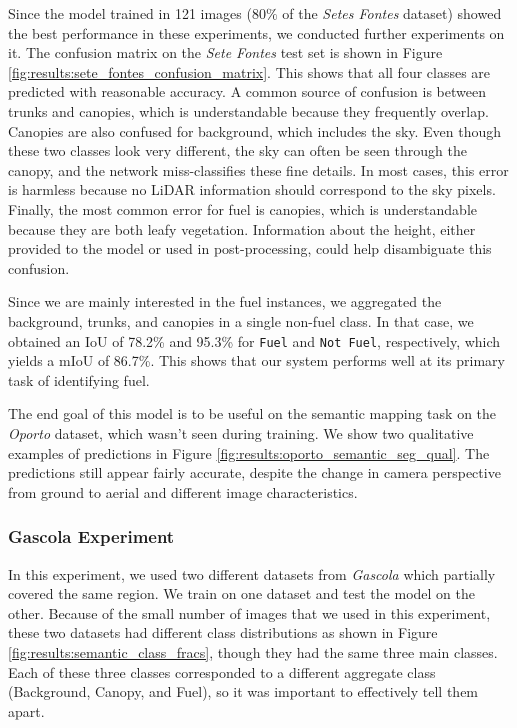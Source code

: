Since the model trained in 121 images ($80\%$ of the \textit{Setes Fontes} dataset) showed the best performance in these experiments, we conducted further experiments on it. The confusion matrix on the \textit{Sete Fontes} test set is shown in Figure \ref{fig:results:sete_fontes_confusion_matrix}. This shows that all four classes are predicted with reasonable accuracy. A common source of confusion is between trunks and canopies, which is understandable because they frequently overlap. Canopies are also confused for background, which includes the sky. Even though these two classes look very different, the sky can often be seen through the canopy, and the network miss-classifies these fine details. In most cases, this error is harmless because no LiDAR information should correspond to the sky pixels. Finally, the most common error for fuel is canopies, which is understandable because they are both leafy vegetation. Information about the height, either provided to the model or used in post-processing, could help disambiguate this confusion. 

Since we are mainly interested in the fuel instances, we aggregated the background, trunks, and canopies in a single non-fuel class. In that case, we obtained an IoU of 78.2\% and 95.3\% for \texttt{Fuel} and \texttt{Not Fuel}, respectively, which yields a mIoU of 86.7\%. This shows that our system performs well at its primary task of identifying fuel.

The end goal of this model is to be useful on the semantic mapping task on the \textit{Oporto} dataset, which wasn't seen during training. We show two qualitative examples of predictions in Figure \ref{fig:results:oporto_semantic_seg_qual}. The predictions still appear fairly accurate, despite the change in camera perspective from ground to aerial and different image characteristics. 


\subsubsection{Gascola Experiment}
In this experiment, we used two different datasets from \textit{Gascola} which partially covered the same region. We train on one dataset and test the model on the other. Because of the small number of images that we used in this experiment, these two datasets had different class distributions as shown in Figure \ref{fig:results:semantic_class_fracs}, though they had the same three main classes. Each of these three classes corresponded to a different aggregate class (Background, Canopy, and Fuel), so it was important to effectively tell them apart. 

